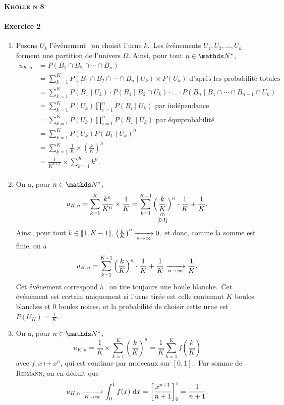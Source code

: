 \documentclass[a4paper,9pt]{article}
\begin{document}
	\begin{center}
		\bfseries\scshape\Huge Khôlle n 8
	\end{center}

	\paragraph{Exercice 2}
	\begin{enumerate}
		\item Posons $U_k$\/ l'événement \guillemotleft~on choisit l'urne $k$.~\guillemotright\@ Les événements $U_1, U_2, \ldots, U_k$\/ forment une partition de l'univers $\Omega$. Ainsi, pour tout $n \in \N^*$,
			\begin{align*}
				u_{K,n}&=P(B_1 \cap B_2 \cap \cdots \cap B_n)\\
				&= \sum_{k=1}^K P(B_1 \cap B_2 \cap \cdots \cap B_n  \mid U_k) \times P(U_k)\text{ d'après les probabilité totales}\\
				&= \sum_{k=1}^K P(B_1  \mid U_k) \cdot P(B_1  \mid B_2 \cap U_k) \cdot \ldots \cdot P(B_n  \mid B_1 \cap \cdots \cap B_{n-1} \cap U_k) \\
				&= \sum_{k=1}^K P(U_k) \prod_{i=1}^n P(B_i  \mid U_k) \text{ par indépendance} \\
				&= \sum_{k=1}^K P(U_k) \prod_{i=1}^n P(B_1  \mid U_k) \text{ par équiprobabilité} \\
				&= \sum_{k=1}^K P(U_k) P(B_1  \mid U_k)^n \\
				&= \sum_{k=1}^K \frac{1}{K} \times \left( \frac{k}{K} \right)^n \\
				&= \frac{1}{K^{n+1}} \times \sum_{k=1}^K k^n. \\
			\end{align*}
		\item On a, pour $n \in \N^*$, \[
				u_{K,n} = \sum_{k=1}^K \frac{k^n}{K^n} \times \frac{1}{K} = \sum_{k=1}^{K-1} \Big( \underset{\substack{\vrt\in\\ [0,1]}}{\frac{k}{K}}\Big)^n \cdot \frac{1}{K} + \frac{1}{K}
			.\]
			Ainsi, pour tout $k \in \llbracket 1,K-1 \rrbracket$, $\left( \frac{k}{K} \right)^n \xrightarrow[n\to \infty]{} 0$, et donc, comme la somme est finie, on a \[
				u_{K,n} = \sum_{k=1}^{K-1} \Big( \frac{k}{K} \Big)^n \cdot \frac{1}{K} + \frac{1}{K} \xrightarrow[n\to \infty]{} \frac{1}{K}
			.\]
			Cet événement correspond à \guillemotleft~on tire toujours une boule blanche.~\guillemotright\@ Cet événement est certain uniquement si l'urne tirée est celle contenant $K$\/ boules blanches et $0$\/ boules noires, et la probabilité de choisir cette urne est $P(U_K) = \frac{1}{K}$.
		\item On a, pour $n \in \N^*$, \[
				u_{K,n} = \frac{1}{K} \times \sum_{k=1}^K \left( \frac{k}{K} \right)^n = \frac{1}{K} \sum_{k=1}^K f\left( \frac{k}{K} \right)
			\] avec $f : x \mapsto x^n$, qui est continue par morceaux sur $[0,1]$\/.. Par somme de \textsc{Riemann}, on en déduit que \[
			u_{K,n} \xrightarrow[K\to \infty]{} \int_{0}^{1} f(x)~\mathrm{d}x = \left[ \frac{x^{n+1}}{n+1} \right]_0^1 = \frac{1}{n+1}
			.\]
	\end{enumerate}
\end{document}
